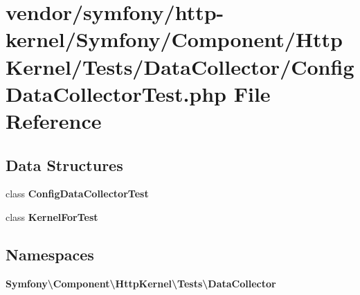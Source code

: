 \section{vendor/symfony/http-\/kernel/\+Symfony/\+Component/\+Http\+Kernel/\+Tests/\+Data\+Collector/\+Config\+Data\+Collector\+Test.php File Reference}
\label{_config_data_collector_test_8php}
\subsection*{Data Structures}
\begin{DoxyCompactItemize}
\item 
class {\bf Config\+Data\+Collector\+Test}
\item 
class {\bf Kernel\+For\+Test}
\end{DoxyCompactItemize}
\subsection*{Namespaces}
\begin{DoxyCompactItemize}
\item 
 {\bf Symfony\textbackslash{}\+Component\textbackslash{}\+Http\+Kernel\textbackslash{}\+Tests\textbackslash{}\+Data\+Collector}
\end{DoxyCompactItemize}

